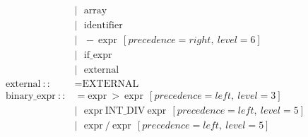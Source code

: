 \documentclass{article}
\begin{document}
\begin{align*}
                                      & |\ \ \ \text{array}                                                                                                                                                                                                       \\
                                      & |\ \ \ \text{identifier}                                                                                                                                                                                                  \\
                                      & |\ \ \ -\ \text{expr}\ \ [precedence=right,\ level=6]                                                                                                                                                                     \\
                                      & |\ \ \ \text{if\_expr}                                                                                                                                                                                                    \\
                                      & |\ \ \ \text{external}                                                                                                                                                                                                    \\
  \text{external}\ ::                 & = \text{EXTERNAL}                                                                                                                                                                                                         \\
  \text{binary\_expr}\ ::             & = \text{expr}\ >\ \text{expr}\ \ [precedence=left,\ level=3]                                                                                                                                                              \\
                                      & |\ \ \ \text{expr}\ \text{INT\_DIV}\ \text{expr}\ \ [precedence=left,\ level=5]                                                                                                                                           \\
                                      & |\ \ \ \text{expr}\ /\ \text{expr}\ \ [precedence=left,\ level=5]                                                                                                                                                         \\

\end{align*}
\end{document}
